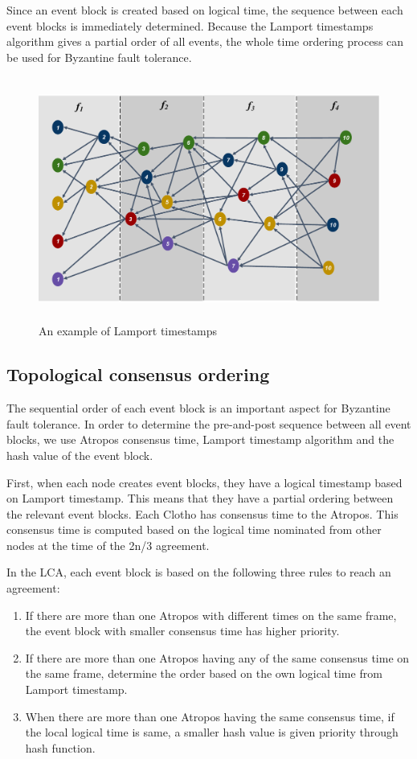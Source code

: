 \documentclass[preprint,12pt]{elsarticle}
\begin{document}
Since an event block is created based on logical time, the sequence between each event blocks is immediately determined. Because the Lamport timestamps algorithm gives a partial order of all events, the whole time ordering process can be used for Byzantine fault tolerance.


\begin{figure} [t] \centering  
	\includegraphics[height=8cm, width=1.0\columnwidth]{Lamport_timestamps.pdf}
	\caption{An example of Lamport timestamps}
	\label{fig:Lamport}
\end{figure}


\subsection{Topological consensus ordering}
The sequential order of each event block is an important aspect for Byzantine fault tolerance. In order to determine the pre-and-post sequence between all event blocks, we use Atropos consensus time, Lamport timestamp algorithm and the hash value of the event block.

First, when each node creates event blocks, they have a logical timestamp based on Lamport timestamp. This means that they have a partial ordering between the relevant event blocks. 
Each Clotho has consensus time to the Atropos. This consensus time is computed based on the logical time nominated from other nodes at the time of the 2n/3 agreement.

In the LCA, each event block is based on the following three rules to reach an agreement:

\begin{enumerate}
	\item If there are more than one Atropos with different times on the same frame, the event block with smaller consensus time has higher priority.
	\item If there are more than one Atropos having any of the same consensus time on the same frame, determine the order based on the own logical time from Lamport timestamp.
	\item When there are more than one Atropos having the same consensus time, if the local logical time is same, a smaller hash value is given priority through hash function.
\end{enumerate}
\end{document}
